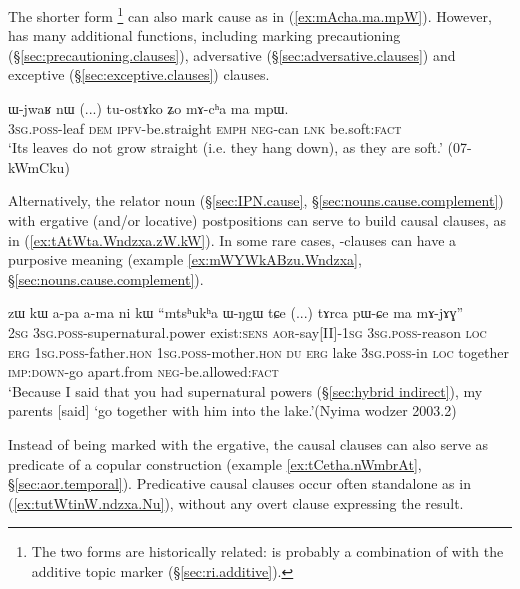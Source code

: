 The shorter form \footnote{The two forms are historically related:  is probably a combination of  with the additive topic marker  (§\ref{sec:ri.additive}). } can also mark cause as in (\ref{ex:mAcha.ma.mpW}). However,  has many additional functions, including marking precautioning (§\ref{sec:precautioning.clauses}), adversative (§\ref{sec:adversative.clauses}) and exceptive (§\ref{sec:exceptive.clauses}) clauses.

\begin{exe}
\ex \label{ex:mAcha.ma.mpW}
\gll ɯ-jwaʁ nɯ (...) tu-ostɤko ʑo mɤ-cʰa ma mpɯ. \\
\textsc{3sg}.\textsc{poss}-leaf \textsc{dem} { } \textsc{ipfv}-be.straight \textsc{emph} \textsc{neg}-can \textsc{lnk} be.soft:\textsc{fact} \\
\glt `Its leaves do not grow straight (i.e. they hang down), as they are soft.' (07-kWmCku)
\end{exe}

Alternatively, the relator noun  (§\ref{sec:IPN.cause}, §\ref{sec:nouns.cause.complement}) with ergative (and/or locative) postpositions can serve to build causal clauses, as in (\ref{ex:tAtWta.Wndzxa.zW.kW}). In some rare cases, -clauses can have a purposive meaning (example \ref{ex:mWYWkABzu.Wndzxa}, §\ref{sec:nouns.cause.complement}).

\begin{exe}
\ex \label{ex:tAtWta.Wndzxa.zW.kW}
 zɯ kɯ a-pa a-ma ni kɯ ``mtsʰukʰa ɯ-ŋgɯ tɕe (...) tɤrca pɯ-ɕe ma mɤ-jɤɣ'' \\
\textsc{2sg} \textsc{3sg}.\textsc{poss}-supernatural.power exist:\textsc{sens} \textsc{aor}-say[II]-\textsc{1sg} \textsc{3sg}.\textsc{poss}-reason \textsc{loc} \textsc{erg} \textsc{1sg}.\textsc{poss}-father.\textsc{hon} \textsc{1sg}.\textsc{poss}-mother.\textsc{hon} \textsc{du} \textsc{erg} lake \textsc{3sg}.\textsc{poss}-in \textsc{loc} {  } together \textsc{imp}:\textsc{down}-go apart.from \textsc{neg}-be.allowed:\textsc{fact} \\
\glt `Because I said that you had supernatural powers (§\ref{sec:hybrid indirect}), my parents [said] `go together with him into the lake.'(Nyima wodzer 2003.2)
\end{exe}

Instead of being marked with the ergative, the causal clauses can also serve as predicate of a copular construction (example \ref{ex:tCetha.nWmbrAt}, §\ref{sec:aor.temporal}). Predicative causal clauses occur often standalone as in (\ref{ex:tutWtinW.ndzxa.Nu}), without any overt clause expressing the result.


